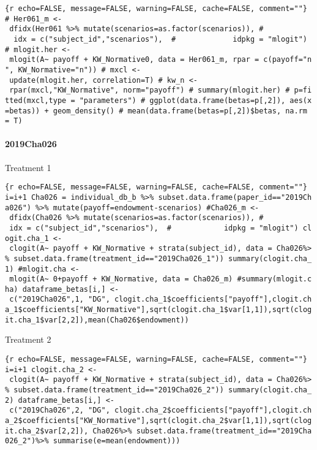 \texttt{\{r\ echo=FALSE,\ message=FALSE,\ warning=FALSE,\ cache=FALSE,\ comment=""\}\ \#\ Her061\_m\ \textless{}-\ dfidx(Her061\ \%\textgreater{}\%\ mutate(scenarios=as.factor(scenarios)),\ \#\ \ \ \ \ \ \ \ \ \ \ \ \ idx\ =\ c("subject\_id","scenarios"),\ \ \#\ \ \ \ \ \ \ \ \ \ \ \ \ idpkg\ =\ "mlogit")\ \#\ mlogit.her\ \textless{}-\ mlogit(A\textasciitilde{}\ payoff\ +\ KW\_Normative\textbar{}0,\ data\ =\ Her061\_m,\ rpar\ =\ c(payoff="n",\ KW\_Normative="n"))\ \#\ mxcl\ \textless{}-\ update(mlogit.her,\ correlation=T)\ \#\ kw\_n\ \textless{}-\ rpar(mxcl,"KW\_Normative",\ norm="payoff")\ \#\ summary(mlogit.her)\ \#\ p=fitted(mxcl,type\ =\ "parameters")\ \#\ ggplot(data.frame(betas=p{[},2{]}),\ aes(x=betas))\ +\ geom\_density()\ \#\ mean(data.frame(betas=p{[},2{]})\$betas,\ na.rm\ =\ T)}

\hypertarget{cha026}{%
\paragraph{2019Cha026}\label{cha026}}

Treatment 1

\texttt{\{r\ echo=FALSE,\ message=FALSE,\ warning=FALSE,\ cache=FALSE,\ comment=""\}\ i=i+1\ Cha026\ =\ individual\_db\_b\ \%\textgreater{}\%\ subset.data.frame(paper\_id=="2019Cha026")\ \%\textgreater{}\%\ mutate(payoff=endowment-scenarios)\ \#Cha026\_m\ \textless{}-\ dfidx(Cha026\ \%\textgreater{}\%\ mutate(scenarios=as.factor(scenarios)),\ \#\ \ \ \ \ \ \ \ \ \ \ \ idx\ =\ c("subject\_id","scenarios"),\ \ \#\ \ \ \ \ \ \ \ \ \ \ \ idpkg\ =\ "mlogit")\ clogit.cha\_1\ \textless{}-\ clogit(A\textasciitilde{}\ payoff\ +\ KW\_Normative\ +\ strata(subject\_id),\ data\ =\ Cha026\%\textgreater{}\%\ subset.data.frame(treatment\_id=="2019Cha026\_1"))\ summary(clogit.cha\_1)\ \#mlogit.cha\ \textless{}-\ mlogit(A\textasciitilde{}\ 0+payoff\ +\ KW\_Normative,\ data\ =\ Cha026\_m)\ \#summary(mlogit.cha)\ dataframe\_betas{[}i,{]}\ \textless{}-\ c("2019Cha026",1,\ "DG",\ clogit.cha\_1\$coefficients{[}"payoff"{]},clogit.cha\_1\$coefficients{[}"KW\_Normative"{]},sqrt(clogit.cha\_1\$var{[}1,1{]}),sqrt(clogit.cha\_1\$var{[}2,2{]}),mean(Cha026\$endowment))}

Treatment 2

\texttt{\{r\ echo=FALSE,\ message=FALSE,\ warning=FALSE,\ cache=FALSE,\ comment=""\}\ i=i+1\ clogit.cha\_2\ \textless{}-\ clogit(A\textasciitilde{}\ payoff\ +\ KW\_Normative\ +\ strata(subject\_id),\ data\ =\ Cha026\%\textgreater{}\%\ subset.data.frame(treatment\_id=="2019Cha026\_2"))\ summary(clogit.cha\_2)\ dataframe\_betas{[}i,{]}\ \textless{}-\ c("2019Cha026",2,\ "DG",\ clogit.cha\_2\$coefficients{[}"payoff"{]},clogit.cha\_2\$coefficients{[}"KW\_Normative"{]},sqrt(clogit.cha\_2\$var{[}1,1{]}),sqrt(clogit.cha\_2\$var{[}2,2{]}),\ Cha026\%\textgreater{}\%\ subset.data.frame(treatment\_id=="2019Cha026\_2")\%\textgreater{}\%\ summarise(e=mean(endowment)))}

